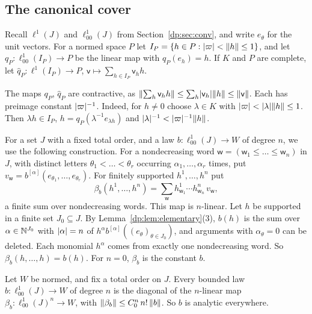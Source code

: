 \subsection{The canonical cover}\label{dp:ssec:cover}

\begin{definition}\label{dp:def:cover}
Recall $\ell^1(J)$ and $\ell^1_{00}(J)$ from Section~\ref{dp:sec:conv}, and write $e_\theta$ for the unit vectors. For a normed space $P$ let $I_P=\{h\in P:\lvert \varpi\rvert<\lVert h\rVert\le1\}$, and let $q_P\colon\ell^1_{00}(I_P)\to P$ be the linear map with $q_P(e_h)=h$. If $K$ and $P$ are complete, let $\hat q_P\colon\ell^1(I_P)\to P$, $\mathsf v\mapsto\sum_{h\in I_P}\mathsf v_hh$.
\end{definition}

The maps $q_P$, $\hat q_P$ are contractive, as $\lVert \sum_h\mathsf v_hh\rVert\le\sum_h\lvert \mathsf v_h\rvert\lVert h\rVert\le\lVert \mathsf v\rVert$. Each has preimage constant $\lvert \varpi\rvert^{-1}$. Indeed, for $h\ne0$ choose $\lambda\in K$ with $\lvert \varpi\rvert<\lvert \lambda\rvert\lVert h\rVert\le1$. Then $\lambda h\in I_P$, $h=q_P(\lambda^{-1}e_{\lambda h})$ and $\lvert \lambda\rvert^{-1}<\lvert \varpi\rvert^{-1}\lVert h\rVert$.

For a set $J$ with a fixed total order, and a law $b\colon\ell^1_{00}(J)\to W$ of degree $n$, we use the following construction. For a nondecreasing word $\mathsf w=(\mathsf w_1\le\dots\le\mathsf w_n)$ in $J$, with distinct letters $\theta_1<\dots<\theta_r$ occurring $\alpha_1,\dots,\alpha_r$ times, put $v_{\mathsf w}=b^{[\alpha]}(e_{\theta_1},\dots,e_{\theta_r})$. For finitely supported $h^1,\dots,h^n$ put
\begin{equation}\label{dp:eq:word-lift}
 \beta_b(h^1,\dots,h^n)=\sum_{\mathsf w}h^1_{\mathsf w_1}\cdots h^n_{\mathsf w_n}\,v_{\mathsf w},
\end{equation}
a finite sum over nondecreasing words. This map is $n$-linear. Let $h$ be supported in a finite set $J_0\subseteq J$. By Lemma~\ref{dp:lem:elementary}(3), $b(h)$ is the sum over $\alpha\in\mathbb N^{J_0}$ with $\lvert \alpha\rvert=n$ of $h^\alpha b^{[\alpha]}((e_\theta)_{\theta\in J_0})$, and arguments with $\alpha_\theta=0$ can be deleted. Each monomial $h^\alpha$ comes from exactly one nondecreasing word. So $\beta_b(h,\dots,h)=b(h)$. For $n=0$, $\beta_b$ is the constant $b$.

\begin{lemma}\label{dp:lem:laws-cover}
Let $W$ be normed, and fix a total order on $J$. Every bounded law $b\colon\ell^1_{00}(J)\to W$ of degree $n$ is the diagonal of the $n$-linear map $\beta_b\colon\ell^1_{00}(J)^n\to W$, with $\lVert \beta_b\rVert\le C_0^n\,n!\,\lVert b\rVert$. So $b$ is analytic everywhere.
\end{lemma}

